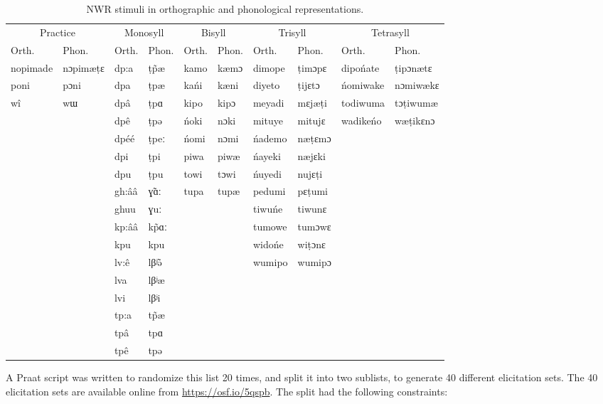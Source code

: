 \documentclass[english,,man,floatsintext]{apa6}
\begin{document}
\begin{table}

\caption{\label{tab:tab2-stims}NWR stimuli in orthographic and phonological representations.}
\centering
\begin{tabular}[t]{llllllllll}
\toprule
\multicolumn{2}{c}{Practice} & \multicolumn{2}{c}{Monosyll} & \multicolumn{2}{c}{Bisyll} & \multicolumn{2}{c}{Trisyll} & \multicolumn{2}{c}{Tetrasyll} \\
\cmidrule(l{3pt}r{3pt}){1-2} \cmidrule(l{3pt}r{3pt}){3-4} \cmidrule(l{3pt}r{3pt}){5-6} \cmidrule(l{3pt}r{3pt}){7-8} \cmidrule(l{3pt}r{3pt}){9-10}
Orth. & Phon. & Orth. & Phon. & Orth. & Phon. & Orth. & Phon. & Orth. & Phon.\\
\midrule
nopimade & nɔpimæṭɛ & dp:a & ṭp̃æ & kamo & kæmɔ & dimope & ṭimɔpɛ & dipońate & ṭipɔnætɛ\\
poni & pɔni & dpa & ṭpæ & kańi & kæni & diyeto & ṭijɛtɔ & ńomiwake & nɔmiwækɛ\\
wî & wɯ & dpâ & ṭpɑ & kipo & kipɔ & meyadi & mɛjæṭi & todiwuma & tɔṭiwumæ\\
 &  & dpê & ṭpə & ńoki & nɔki & mituye & mitujɛ & wadikeńo & wæṭikɛnɔ\\
 &  & dpéé & ṭpeː & ńomi & nɔmi & ńademo & næṭɛmɔ &  & \\
\addlinespace
 &  & dpi & ṭpi & piwa & piwæ & ńayeki & næjɛki &  & \\
 &  & dpu & ṭpu & towi & tɔwi & ńuyedi & nujɛṭi &  & \\
 &  & gh:ââ & ɣ̃ɑː & tupa & tupæ & pedumi & pɛṭumi &  & \\
 &  & ghuu & ɣuː &  &  & tiwuńe & tiwunɛ &  & \\
 &  & kp:ââ & kp̃ɑː &  &  & tumowe & tumɔwɛ &  & \\
\addlinespace
 &  & kpu & kpu &  &  & widońe & wiṭɔnɛ &  & \\
 &  & lv:ê & lβʲ̃ə &  &  & wumipo & wumipɔ &  & \\
 &  & lva & lβʲæ &  &  &  &  &  & \\
 &  & lvi & lβʲi &  &  &  &  &  & \\
 &  & tp:a & tp̃æ &  &  &  &  &  & \\
\addlinespace
 &  & tpâ & tpɑ &  &  &  &  &  & \\
 &  & tpê & tpə &  &  &  &  &  & \\
\bottomrule
\end{tabular}
\end{table}

A Praat script was written to randomize this list 20 times, and split it into two sublists, to generate 40 different elicitation sets. The 40 elicitation sets are available online from \url{https://osf.io/5qspb}. The split had the following constraints:
\end{document}
